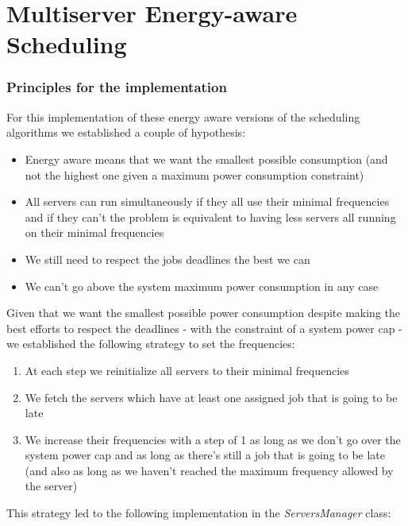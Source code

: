 \documentclass[./report.tex]{subfiles}
\begin{document}
\part{Multiserver Energy-aware Scheduling}

\section{Principles for the implementation}
\label{sec:energyAware_principles}

For this implementation of these energy aware versions of the scheduling algorithms we established a couple of hypothesis:
\begin{itemize}
	\item Energy aware means that we want the smallest possible consumption (and not the highest one given a maximum power consumption constraint)
	\item All servers can run simultaneously if they all use their minimal frequencies and if they can't the problem is equivalent to having less servers all running on their minimal frequencies
	\item We still need to respect the jobs deadlines the best we can
	\item We can't go above the system maximum power consumption in any case\\
\end{itemize}

Given that we want the smallest possible power consumption despite making the best efforts to respect the deadlines - with the constraint of a system power cap - we established the following strategy to set the frequencies:
\begin{enumerate}
	\item At each step we reinitialize all servers to their minimal frequencies
	\item We fetch the servers which have at least one assigned job that is going to be late
	\item We increase their frequencies with a step of 1 as long as we don't go over the system power cap and as long as there's still a job that is going to be late (and also as long as we haven't reached the maximum frequency allowed by the server)\\
\end{enumerate}

This strategy led to the following implementation in the \textit{ServersManager} class:
\end{document}
